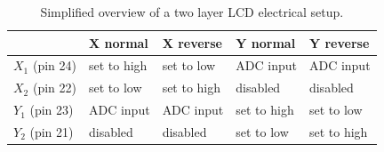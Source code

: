 \begin{table}
\caption{Simplified overview of a two layer LCD electrical setup.}
\begin{tabular}{|l|l|l|l|l|}
\hline
 & X normal & X reverse & Y normal & Y reverse \\ \hline
 $X_{1}$ (pin 24) & set to high & set to low & ADC input & ADC input \\ \hline
 $X_{2}$ (pin 22) & set to low & set to high & disabled & disabled\\ \hline
 $Y_{1}$ (pin 23) & ADC input & ADC input & set to high & set to low \\ \hline
 $Y_{2}$ (pin 21) & disabled & disabled & set to low & set to high \\ \hline
\end{tabular}
\label{table:LCD_screen_measurement} 
\end{table}


 
